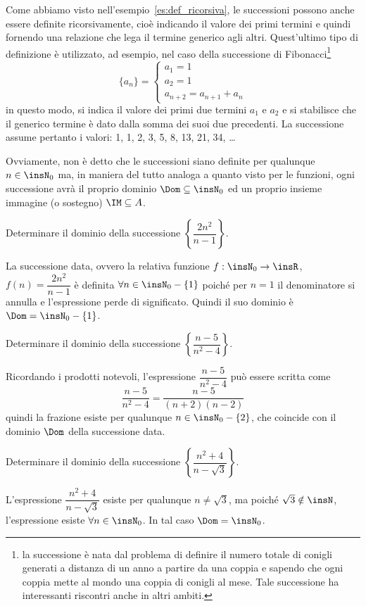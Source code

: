 Come abbiamo visto nell'esempio~\ref{es:def_ricorsiva}, le successioni possono anche essere definite ricorsivamente, cioè indicando il valore dei primi termini e quindi fornendo una relazione che lega il termine generico agli altri.
Quest'ultimo tipo di definizione è utilizzato, ad esempio, nel caso della successione di Fibonacci\footnote{la successione è nata dal problema di definire il numero totale di conigli generati a distanza di un anno a partire da una coppia e sapendo che ogni coppia mette al mondo una coppia di conigli al mese. Tale successione ha interessanti riscontri anche in altri ambiti.}
\[\{a_n\}=\left\{\begin{array}{l}a_1=1\\a_2=1\\a_{n+2}=a_{n+1}+a_{n}\end{array}\right.\]
in questo modo, si indica il valore dei primi due termini $a_1$ e $a_2$ e si stabilisce che il generico termine è dato dalla somma dei suoi due precedenti. La successione assume pertanto i valori: 1, 1, 2, 3, 5, 8, 13, 21, 34, \ldots

Ovviamente, non è detto che le successioni siano definite per qualunque $n\in\insN_0$ ma, in maniera del tutto analoga a quanto visto per le funzioni, ogni successione avrà il proprio dominio $\Dom \subseteq \insN_0$ ed un proprio insieme immagine (o sostegno) $\IM \subseteq A$.

\begin{exrig}
\begin{esempio}
Determinare il dominio della successione $\left\{\dfrac{2n^2}{n-1}\right\}$.

La successione data, ovvero la relativa funzione $f:\insN_0 \to \insR$, $f(n) = \dfrac{2n^2}{n-1}$ è definita $\forall n\in\insN_0-\{1\}$ poiché per $n=1$ il denominatore si annulla e l'espressione perde di significato. Quindi il suo dominio è $\Dom = \insN_0-\{1\}$.
\end{esempio}
\begin{esempio}
Determinare il dominio della successione $\left\{\dfrac{n-5}{n^2-4}\right\}$.

Ricordando i prodotti notevoli, l'espressione $\dfrac{n-5}{n^2-4}$ può essere scritta come
\[\dfrac{n-5}{n^2-4} = \dfrac{n-5}{(n+2)(n-2)}\]
quindi la frazione esiste per qualunque $n\in\insN_0-\{2\}$, che coincide con il dominio $\Dom$ della successione data.
\end{esempio}

\begin{esempio}
Determinare il dominio della successione $\left\{\dfrac{n^2+4}{n-\sqrt{3}}\right\}$.

L'espressione $\dfrac{n^2+4}{n-\sqrt{3}}$ esiste per qualunque $n \neq \sqrt{3}$, ma poiché $\sqrt{3}\notin\insN$, l'espressione esiste $\forall n\in\insN_0$. In tal caso $\Dom = \insN_0$.
\end{esempio}
\end{exrig}

